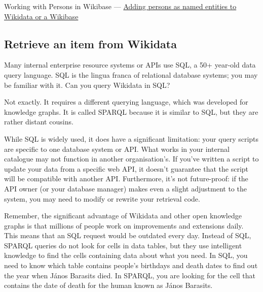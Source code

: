 \documentclass[
  letterpaper,
  DIV=11,
  numbers=noendperiod]{scrreprt}
\begin{document}
\begin{tcolorbox}[enhanced jigsaw, opacityback=0, bottomrule=.15mm, rightrule=.15mm, toptitle=1mm, breakable, colbacktitle=quarto-callout-tip-color!10!white, colback=white, title=\textcolor{quarto-callout-tip-color}{\faLightbulb}\hspace{0.5em}{Further tutorial}, leftrule=.75mm, toprule=.15mm, left=2mm, arc=.35mm, colframe=quarto-callout-tip-color-frame, coltitle=black, titlerule=0mm, bottomtitle=1mm, opacitybacktitle=0.6]

Working with Persons in Wikibase ---
\href{https://opencollections.net/documents/tutorials/wikibase_persons_tutorial.html\#/title-slide}{Adding
persons as named entities to Wikidata or a Wikibase}

\end{tcolorbox}

\subsection{Retrieve an item from
Wikidata}\label{retrieve-an-item-from-wikidata}

Many internal enterprise resource systems or APIs use SQL, a 50+
year-old data query language. SQL is the lingua franca of relational
database systems; you may be familiar with it. Can you query Wikidata in
SQL?

Not exactly. It requires a different querying language, which was
developed for knowledge graphs. It is called SPARQL because it is
similar to SQL, but they are rather distant cousins.

While SQL is widely used, it does have a significant limitation: your
query scripts are specific to one database system or API. What works in
your internal catalogue may not function in another organisation's. If
you've written a script to update your data from a specific web API, it
doesn't guarantee that the script will be compatible with another API.
Furthermore, it's not future-proof: if the API owner (or your database
manager) makes even a slight adjustment to the system, you may need to
modify or rewrite your retrieval code.

Remember, the significant advantage of Wikidata and other open knowledge
graphs is that millions of people work on improvements and extensions
daily. This means that an SQL request would be outdated every day.
Instead of SQL, SPARQL queries do not look for cells in data tables, but
they use intelligent knowledge to find the cells containing data about
what you need. In SQL, you need to know which table contains people's
birthdays and death dates to find out the year when János Barasits died.
In SPARQL, you are looking for the cell that contains the date of death
for the human known as János Barasits.
\end{document}
